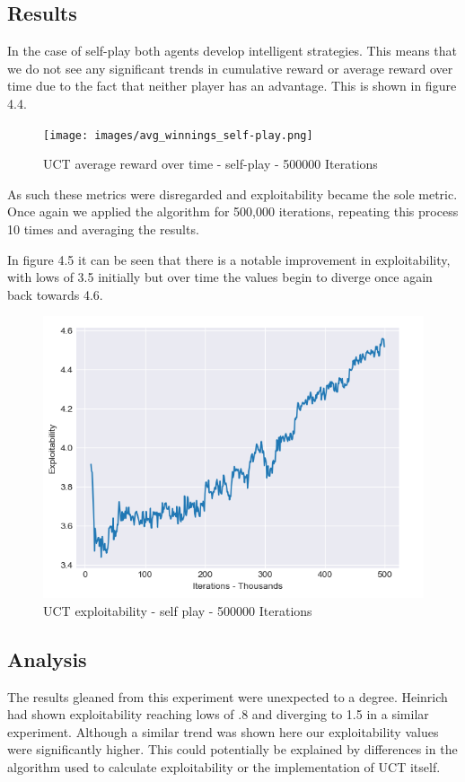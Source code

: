 \subsection{Results}\label{subsec:results2}
In the case of self-play both agents develop intelligent strategies.
This means that we do not see any significant trends in cumulative reward or average reward over time
due to the fact that neither player has an advantage.
This is shown in figure 4.4.
\begin{figure}[ht]
    \texttt{[image: images/avg\_winnings\_self-play.png]}
    \caption{UCT average reward over time - self-play - 500000 Iterations}
\end{figure}
As such these metrics were disregarded and exploitability became the sole metric.
Once again we applied the algorithm for 500,000 iterations, repeating this process 10 times
and averaging the results.

In figure 4.5 it can be seen that there is a notable improvement in exploitability, with lows of 3.5 initially
but over time the values begin to diverge once again back towards 4.6.

\begin{figure}[ht]
    \includegraphics[scale=.7]{images/exploitability_self-play_deterministic_500000.png}
    \caption{UCT exploitability - self play - 500000 Iterations}
\end{figure}

\subsection{Analysis}\label{subsec:analysis2}
The results gleaned from this experiment were unexpected to a degree.
Heinrich had shown exploitability reaching lows of .8 and diverging to 1.5 in a similar experiment.
Although a similar trend was shown here our exploitability values were significantly higher.
This could potentially be explained by differences in the algorithm used to calculate exploitability
or the implementation of UCT itself.

